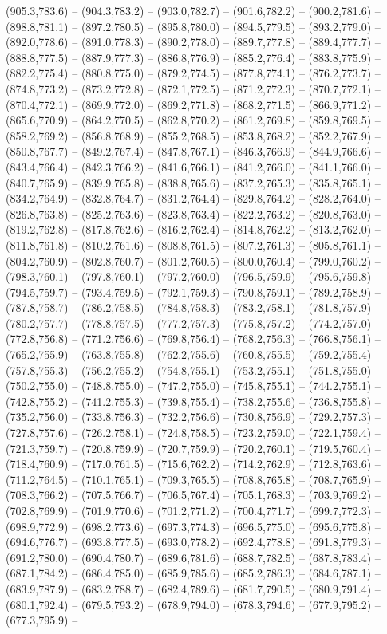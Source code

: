 (905.3,783.6) -- (904.3,783.2) -- (903.0,782.7) -- (901.6,782.2) -- (900.2,781.6) -- (898.8,781.1) -- (897.2,780.5) -- (895.8,780.0) -- (894.5,779.5) -- (893.2,779.0) -- (892.0,778.6) -- (891.0,778.3) -- (890.2,778.0) -- (889.7,777.8) -- (889.4,777.7) -- (888.8,777.5) -- (887.9,777.3) -- (886.8,776.9) -- (885.2,776.4) -- (883.8,775.9) -- (882.2,775.4) -- (880.8,775.0) -- (879.2,774.5) -- (877.8,774.1) -- (876.2,773.7) -- (874.8,773.2) -- (873.2,772.8) -- (872.1,772.5) -- (871.2,772.3) -- (870.7,772.1) -- (870.4,772.1) -- (869.9,772.0) -- (869.2,771.8) -- (868.2,771.5) -- (866.9,771.2) -- (865.6,770.9) -- (864.2,770.5) -- (862.8,770.2) -- (861.2,769.8) -- (859.8,769.5) -- (858.2,769.2) -- (856.8,768.9) -- (855.2,768.5) -- (853.8,768.2) -- (852.2,767.9) -- (850.8,767.7) -- (849.2,767.4) -- (847.8,767.1) -- (846.3,766.9) -- (844.9,766.6) -- (843.4,766.4) -- (842.3,766.2) -- (841.6,766.1) -- (841.2,766.0) -- (841.1,766.0) -- (840.7,765.9) -- (839.9,765.8) -- (838.8,765.6) -- (837.2,765.3) -- (835.8,765.1) -- (834.2,764.9) -- (832.8,764.7) -- (831.2,764.4) -- (829.8,764.2) -- (828.2,764.0) -- (826.8,763.8) -- (825.2,763.6) -- (823.8,763.4) -- (822.2,763.2) -- (820.8,763.0) -- (819.2,762.8) -- (817.8,762.6) -- (816.2,762.4) -- (814.8,762.2) -- (813.2,762.0) -- (811.8,761.8) -- (810.2,761.6) -- (808.8,761.5) -- (807.2,761.3) -- (805.8,761.1) -- (804.2,760.9) -- (802.8,760.7) -- (801.2,760.5) -- (800.0,760.4) -- (799.0,760.2) -- (798.3,760.1) -- (797.8,760.1) -- (797.2,760.0) -- (796.5,759.9) -- (795.6,759.8) -- (794.5,759.7) -- (793.4,759.5) -- (792.1,759.3) -- (790.8,759.1) -- (789.2,758.9) -- (787.8,758.7) -- (786.2,758.5) -- (784.8,758.3) -- (783.2,758.1) -- (781.8,757.9) -- (780.2,757.7) -- (778.8,757.5) -- (777.2,757.3) -- (775.8,757.2) -- (774.2,757.0) -- (772.8,756.8) -- (771.2,756.6) -- (769.8,756.4) -- (768.2,756.3) -- (766.8,756.1) -- (765.2,755.9) -- (763.8,755.8) -- (762.2,755.6) -- (760.8,755.5) -- (759.2,755.4) -- (757.8,755.3) -- (756.2,755.2) -- (754.8,755.1) -- (753.2,755.1) -- (751.8,755.0) -- (750.2,755.0) -- (748.8,755.0) -- (747.2,755.0) -- (745.8,755.1) -- (744.2,755.1) -- (742.8,755.2) -- (741.2,755.3) -- (739.8,755.4) -- (738.2,755.6) -- (736.8,755.8) -- (735.2,756.0) -- (733.8,756.3) -- (732.2,756.6) -- (730.8,756.9) -- (729.2,757.3) -- (727.8,757.6) -- (726.2,758.1) -- (724.8,758.5) -- (723.2,759.0) -- (722.1,759.4) -- (721.3,759.7) -- (720.8,759.9) -- (720.7,759.9) -- (720.2,760.1) -- (719.5,760.4) -- (718.4,760.9) -- (717.0,761.5) -- (715.6,762.2) -- (714.2,762.9) -- (712.8,763.6) -- (711.2,764.5) -- (710.1,765.1) -- (709.3,765.5) -- (708.8,765.8) -- (708.7,765.9) -- (708.3,766.2) -- (707.5,766.7) -- (706.5,767.4) -- (705.1,768.3) -- (703.9,769.2) -- (702.8,769.9) -- (701.9,770.6) -- (701.2,771.2) -- (700.4,771.7) -- (699.7,772.3) -- (698.9,772.9) -- (698.2,773.6) -- (697.3,774.3) -- (696.5,775.0) -- (695.6,775.8) -- (694.6,776.7) -- (693.8,777.5) -- (693.0,778.2) -- (692.4,778.8) -- (691.8,779.3) -- (691.2,780.0) -- (690.4,780.7) -- (689.6,781.6) -- (688.7,782.5) -- (687.8,783.4) -- (687.1,784.2) -- (686.4,785.0) -- (685.9,785.6) -- (685.2,786.3) -- (684.6,787.1) -- (683.9,787.9) -- (683.2,788.7) -- (682.4,789.6) -- (681.7,790.5) -- (680.9,791.4) -- (680.1,792.4) -- (679.5,793.2) -- (678.9,794.0) -- (678.3,794.6) -- (677.9,795.2) -- (677.3,795.9) -- 